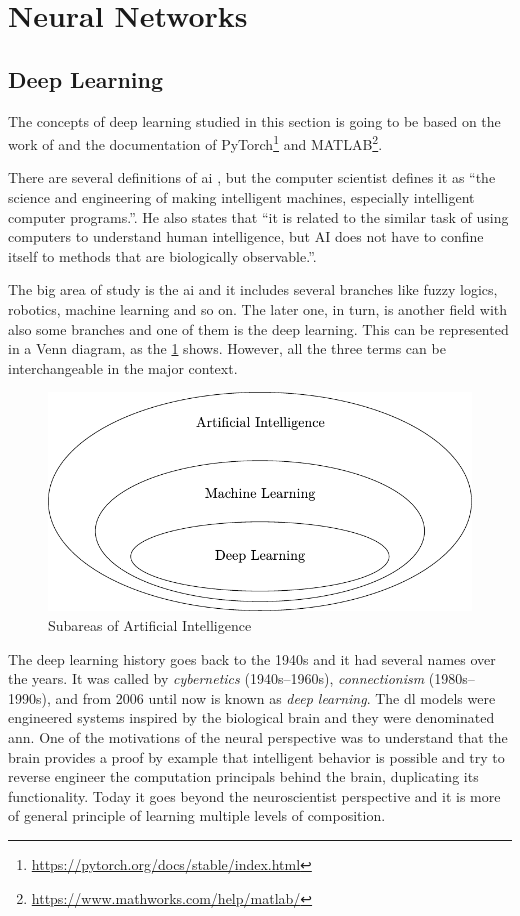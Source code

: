 \section{Neural Networks}

\subsection{Deep Learning}

The concepts of deep learning studied in this section is going to be based on the work of \citet{goodfellow2016} and the documentation of PyTorch\footnote{\url{https://pytorch.org/docs/stable/index.html}} and MATLAB\footnote{\url{https://www.mathworks.com/help/matlab/}}.

There are several definitions of \gls*{ai} \citep{winston1992}, but the  computer scientist \citet{mccarthy2007} defines it as ``the science and engineering of making intelligent machines, especially intelligent computer programs.''.
He also states that ``it is related to the similar task of using computers to understand human intelligence, but AI does not have to confine itself to methods that are biologically observable.''.

The big area of study is the \gls*{ai} and it includes several branches like fuzzy logics, robotics, machine learning and so on. 
The later one, in turn, is another field with also some branches and one of them is the deep learning.
This can be represented in a Venn diagram, as the \cref{fig:venn_dl} shows.
However, all the three terms can be interchangeable in the major context.
%
\begin{figure}[!htb]
    \centering
    \includegraphics{figures/3review/nn/venn_dl.pdf}
    \caption{Subareas of Artificial Intelligence}
    \label{fig:venn_dl}
\end{figure}

The deep learning history goes back to the 1940s and it had several names over the years. 
It was called by \emph{cybernetics} (1940s--1960s), \emph{connectionism} (1980s--1990s), and from 2006 until now is known as \emph{deep learning}.
The \gls*{dl} models were engineered systems inspired by the biological brain and they were denominated \gls*{ann}.
One of the motivations of the neural  perspective was to understand that the brain provides a proof by example that intelligent behavior is possible and try to reverse engineer the computation principals behind the brain, duplicating its functionality.
Today it goes beyond the neuroscientist perspective and it is more of general principle of learning multiple levels of composition.

